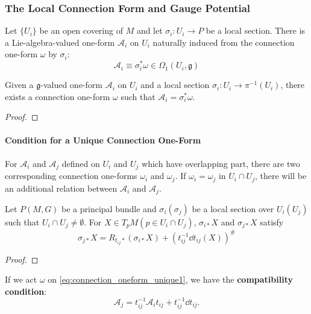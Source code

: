 \documentclass[10pt]{article}
\begin{document}
\subsubsection{The Local Connection Form and Gauge Potential}
Let $\{U_i\}$ be an open covering of $M$ and let $\sigma_i:U_i\to P$ be a local section.
There is a Lie-algebra-valued one-form $\mathcal{A}_i$ on $U_i$ naturally induced from the connection one-form $\omega$ by $\sigma_i$:
\begin{equation}
    \mathcal{A}_i\equiv\sigma_i^\ast\omega\in\Omega_1(U_i,\mathfrak{g})
\end{equation}


\begin{theorem}
    Given a $\mathfrak{g}$-valued one-form $\mathcal{A}_i$ on $U_i$ and a local section $\sigma_i:U_i\to\pi^{-1}(U_i)$, there exists a connection one-form $\omega$ such that $\mathcal{A}_i=\sigma_i^{\ast}\omega$.
\end{theorem}
\begin{proof}
    
\end{proof}

\paragraph{Condition for a Unique Connection One-Form}
For $\mathcal{A}_i$ and $\mathcal{A}_j$ defined on $U_i$ and $U_j$ which have overlapping part, there are two corresponding connection one-forms $\omega_i$ and $\omega_j$.
If $\omega_i=\omega_j$ in $U_i\cap U_j$, there will be an additional relation between $\mathcal{A}_i$ and $\mathcal{A}_j$.
\begin{lemma}
    Let $P(M,G)$ be a principal bundle and $\sigma_i (\sigma_j)$ be a local section over $U_i(U_j)$ such that $U_i\cap U_j\neq\emptyset$.
    For $X\in T_p M (p\in U_i\cap U_j)$, $\sigma_{i\ast}X$ and $\sigma_{j\ast}X$ satisfy 
    \begin{equation}\label{eq:connection_oneform_unique1}
        \sigma_{j\ast}X=R_{t_{ij}\ast}(\sigma_{i\ast}X)+(t_{ij}^{-1}\dd{t_{ij}(X)})^\#
    \end{equation}
\end{lemma}
\begin{proof}
    
\end{proof}
If we act $\omega$ on \cref{eq:connection_oneform_unique1}, we have the \textbf{compatibility condition}:
\begin{equation}
    \mathcal{A}_j=t_{ij}^{-1} \mathcal{A}_i t_{ij}+t_{ij}^{-1}\dd{t_{ij}}.
\end{equation}


\clearpage




\end{document}
